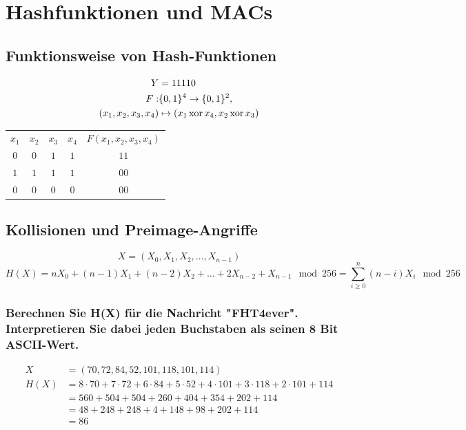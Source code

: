 \section{Hashfunktionen und MACs}
\subsection{Funktionsweise von Hash-Funktionen}

\begin{eqnarray}
	 Y                      & = 11110 \\
	 F:                     & \{0,1\}^4 \rightarrow \{0,1\}^2 ,\\
	 (x_1, x_2, x_3, x_4) & \mapsto (x_1 \operatorname*{xor} x_4, x_2 \operatorname*{xor} x_3)
\end{eqnarray}

\begin{center}
\begin{tabular}{cc|cc|c}
$x_1$ & $x_2$ & $x_3$ & $x_4$ & $F(x_1,x_2,x_3,x_4)$ \\
$0$ & $0$ & $1$ & $1$ & $11$ \\
$1$ & $1$ & $1$ & $1$ & $00$ \\
$0$ & $0$ & $0$ & $0$ & $00$ \\
\end{tabular}
\end{center}

\subsection{Kollisionen und Preimage-Angriffe}
\[ X = (X_0,X_1,X_2, \ldots , X_{n-1}) \]
\[H(X) = nX_0 + (n - 1)X_1 + (n - 2)X_2 + \ldots +2X_{n−2} + X_{n−1} \mod 256 = \sum\limits_{i\ge 0}^n (n-i)X_i \mod 256 \]
\subsubsection{Berechnen Sie H(X) für die Nachricht "FHT4ever". Interpretieren Sie dabei jeden Buchstaben als seinen 8 Bit ASCII-Wert.}
\begin{align}
X    &= (70, 72, 84, 52, 101, 118, 101, 114) \\
H(X) &= 8 \cdot 70 + 7 \cdot 72 + 6 \cdot 84 + 5 \cdot 52 + 4 \cdot 101 + 3 \cdot 118 + 2 \cdot 101 + 114\\
     &= 560 + 504 + 504 + 260 + 404 + 354 + 202 + 114 \\
     &= 48 + 248 + 248 + 4 + 148 + 98 + 202 + 114     \\
     &= 86
\end{align}

